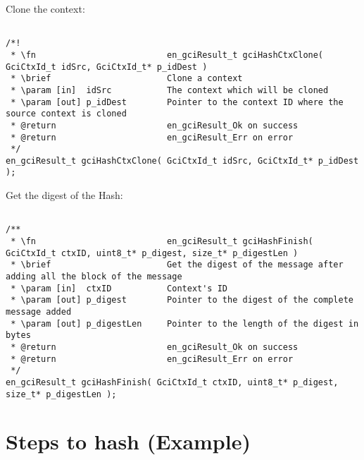 Clone the context:
\begin{lstlisting}

/*!
 * \fn 							en_gciResult_t gciHashCtxClone( GciCtxId_t idSrc, GciCtxId_t* p_idDest )
 * \brief						Clone a context
 * \param [in]  idSrc			The context which will be cloned
 * \param [out] p_idDest		Pointer to the context ID where the source context is cloned
 * @return						en_gciResult_Ok on success
 * @return						en_gciResult_Err on error
 */
en_gciResult_t gciHashCtxClone( GciCtxId_t idSrc, GciCtxId_t* p_idDest );

\end{lstlisting}


Get the digest of the Hash:
\begin{lstlisting}

/**
 * \fn							en_gciResult_t gciHashFinish( GciCtxId_t ctxID, uint8_t* p_digest, size_t* p_digestLen )
 * \brief						Get the digest of the message after adding all the block of the message
 * \param [in]  ctxID	 		Context's ID
 * \param [out] p_digest		Pointer to the digest of the complete message added
 * \param [out] p_digestLen		Pointer to the length of the digest in bytes
 * @return						en_gciResult_Ok on success
 * @return						en_gciResult_Err on error
 */
en_gciResult_t gciHashFinish( GciCtxId_t ctxID, uint8_t* p_digest, size_t* p_digestLen );

\end{lstlisting}

\newpage

\section{Steps to hash (Example)}

